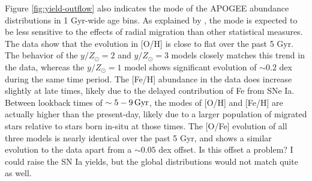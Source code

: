 \documentclass[twocolumn,twocolappendix,linenumbers]{aastex631}
\newcommand{\todo}[1]{{\color{red}#1}}
\begin{document}
Figure \ref{fig:yield-outflow} also indicates the mode of the APOGEE abundance distributions in 1 Gyr-wide age bins. As explained by \citet{johnson_milky_2024}, the mode is expected to be less sensitive to the effects of radial migration than other statistical measures. The data show that the evolution in [O/H] is close to flat over the past 5 Gyr. The behavior of the $y/Z_\odot=2$ and $y/Z_\odot=3$ models closely matches this trend in the data, whereas the $y/Z_\odot=1$ model shows significant evolution of $\sim0.2$ dex during the same time period. The [Fe/H] abundance in the data does increase slightly at late times, likely due to the delayed contribution of Fe from SNe Ia. Between lookback times of $\sim5-9\,{\rm Gyr}$, the modes of [O/H] and [Fe/H] are actually higher than the present-day, likely due to a larger population of migrated stars relative to stars born in-situ at those times. The [O/Fe] evolution of all three models is nearly identical over the past 5 Gyr, and shows a similar evolution to the data apart from a $\sim0.05$ dex offset. \todo{Is this offset a problem? I could raise the SN Ia yields, but the global distributions would not match quite as well.}
\end{document}
